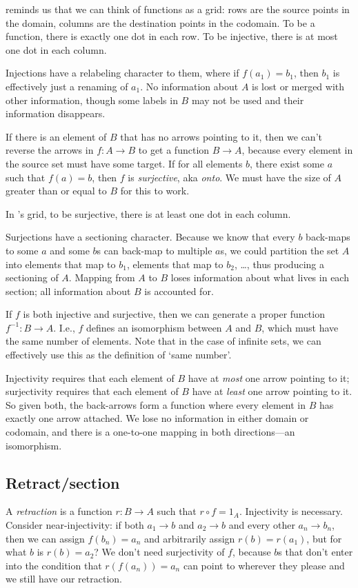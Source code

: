 \documentclass[11pt]{article}
\begin{document}
\citet{aluffi:zero} reminds us that we can think of functions as a grid: rows are the source points
in the domain, columns are the destination points in the codomain.
To be a function, there is exactly one dot in each row.
To be injective, there is at most one dot in each column.

Injections have a relabeling character to them, where if $f(a_1)=b_1$, then $b_1$ is
effectively just a renaming of $a_1$. No information about $A$ is lost or merged with
other information, though some labels in $B$ may not be used and their information
disappears.

If there is an element of $B$ that has no arrows pointing to it, then we can't reverse the
arrows in $f:A\to B$ to get a function $B\to A$, because every element in the source set
must have some target. If for all elements $b$, there exist some $a$ such that $f(a)=b$,
then $f$ is {\em surjective}, aka {\em onto}. We must have the size of $A$ greater than or equal
to $B$ for this to work.

In \citet{aluffi:zero}'s grid, to be surjective, there is at least one dot in each column.

Surjections have a sectioning character.  Because we know that every $b$ back-maps to some $a$ and some $b$s
can back-map to multiple $a$s, we could partition the set $A$ into elements that map to $b_1$,
elements that map to $b_2$, \dots, thus producing a sectioning of $A$. Mapping from $A$ to
$B$ loses information about what lives in each section; all information about $B$ is
accounted for.

If $f$ is both injective and surjective, then we can generate a proper function
$f^{-1}:B\to A$. I.e., $f$ defines an isomorphism between $A$ and $B$, which must have
the same number of elements. Note that in the case of infinite sets, we can effectively
use this as the definition of `same number'.

Injectivity requires that each element of $B$ have at {\em most} one arrow pointing
to it; surjectivity requires that each element of $B$ have at {\em least} one arrow
pointing to it.  So given both, the back-arrows form a function where every element in
$B$ has exactly one arrow attached. We lose no information in either domain or codomain,
and there is a one-to-one mapping in both directions---an isomorphism.

\subsection{Retract/section}
A {\em retraction} is a function $r:B\to A$ such that $r\circ f=1_A$. Injectivity is
necessary. Consider near-injectivity: if both $a_1\to b$ and $a_2\to b$ and every other
$a_n\to b_n$, then we can assign $f(b_n)=a_n$ and arbitrarily assign $r(b)=r(a_1)$,
but for what $b$ is $r(b)=a_2$?  We don't need surjectivity of $f$, because $b$s that
don't enter into the condition that $r(f(a_n))=a_n$ can point to wherever they please
and we still have our retraction.
\end{document}
